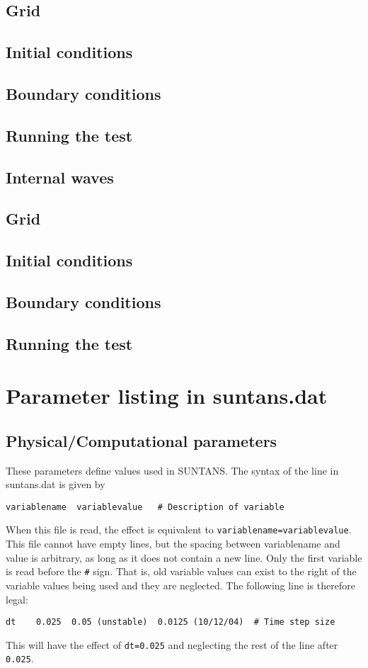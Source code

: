 \documentclass[12pt,oneside]{article}
\begin{document}
\subsection{Grid}
\subsection{Initial conditions}
\subsection{Boundary conditions}
\subsection{Running the test}

\subsection{Internal waves} \label{sec:internalwaves}

\subsection{Grid}
\subsection{Initial conditions}
\subsection{Boundary conditions}
\subsection{Running the test}

\section{Parameter listing in suntans.dat} \label{sec:params}

\subsection{Physical/Computational parameters}

These parameters define values used in SUNTANS.  The syntax of the line in suntans.dat is given by
\begin{verbatim}
variablename  variablevalue   # Description of variable
\end{verbatim}
When this file is read, the effect is equivalent to \verb+variablename=variablevalue+.
This file cannot have empty lines, but the spacing between variablename and value is arbitrary, as long
as it does not contain a new line.  Only the first variable is read before the \verb+#+ sign.  That is, old variable values can exist to
the right of the variable values being used and they are neglected.  The following line is therefore legal:
\begin{verbatim}
dt    0.025  0.05 (unstable)  0.0125 (10/12/04)  # Time step size
\end{verbatim}
This will have the effect of \verb+dt=0.025+ and neglecting the rest of the line after \verb+0.025+.
\end{document}
